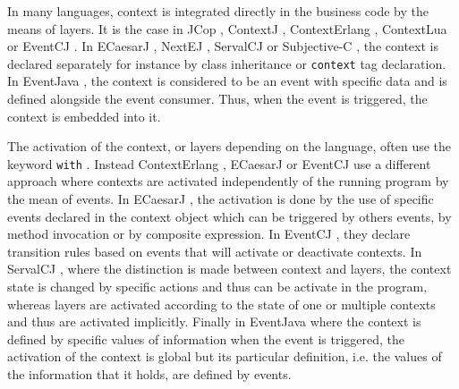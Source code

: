 \documentclass{sig-alternate}
\begin{document}
In many languages, context is integrated directly in the business code by the means of layers. It is the case in JCop \cite{appeltauer_declarative_2013}, ContextJ \cite{appeltauer_improving_2009}, ContextErlang \cite{ghezzi_context_2010}, ContextLua \cite{wasty_contextlua:_2010} or EventCJ \cite{kamina_eventcj:_2011}. In ECaesarJ \cite{nunez_declarative_2009}, NextEJ \cite{kamina_towards_2009}, ServalCJ \cite{Kamina:2015:GLA:2724525.2724570} or Subjective-C \cite{RELEASeD-2010-857551}, the context is declared separately for instance by class inheritance or \lstinline|context| tag declaration. In EventJava \cite{jayaram_context-oriented_2009}, the context is considered to be an event with specific data and is defined alongside the event consumer. Thus, when the event is triggered, the context is embedded into it.

The activation of the context, or layers depending on the language, often use the keyword \lstinline|with| \cite{haupt_contextj:_2011} \cite{appeltauer_declarative_2013} \cite{kamina_towards_2009} \cite{wasty_contextlua:_2010}. Instead ContextErlang \cite{ghezzi_context_2010}, ECaesarJ \cite{nunez_declarative_2009} or EventCJ \cite{kamina_eventcj:_2011} use a different approach where contexts are activated independently of the running program by the mean of events. In ECaesarJ \cite{nunez_declarative_2009}, the activation is done by the use of specific events declared in the context object which can be triggered by others events, by method invocation or by composite expression. In EventCJ \cite{kamina_eventcj:_2011}, they declare transition rules based on events that will activate or deactivate contexts. In ServalCJ \cite{kamina_unified_2013} \cite{ Kamina:2015:GLA:2724525.2724570}, where the distinction is made between context and layers, the context state is changed by specific actions and thus can be activate in the program, whereas layers are activated according to the state of one or multiple contexts and thus are activated implicitly. Finally in EventJava \cite{jayaram_context-oriented_2009} where the context is defined by specific values of information when the event is triggered, the activation of the context is global but its particular definition, i.e. the values of the information that it holds, are defined by events.
\end{document}
